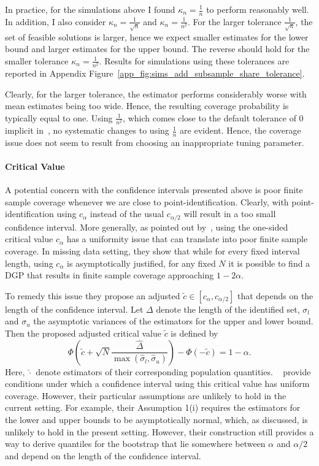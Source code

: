 \documentclass[12pt,a4paper,english]{article} %
\numberwithin{equation}{section}
\theoremstyle{definition}
\theoremstyle{remark}
\theoremstyle{plain}
\begin{document}
In practice, for the simulations above I found $\kappa_n = \frac{1}{n}$ to perform reasonably well.
In addition, I also consider $\kappa_n = \frac{1}{\sqrt{n}}$ and $\kappa_n = \frac{1}{n^2}$.
For the larger tolerance $\frac{1}{\sqrt{n}}$, the set of feasible solutions is larger, hence we expect smaller estimates for the lower bound and larger estimates for the upper bound.
The reverse should hold for the smaller tolerance $\kappa_n = \frac{1}{n^2}$.
Results for simulations using these tolerances are reported in Appendix Figure~\ref{app_fig:sims_add_subsample_share_tolerance}.

Clearly, for the larger tolerance, the estimator performs considerably worse with mean estimates being too wide.
Hence, the resulting coverage probability is typically equal to one.
Using $\frac{1}{n^2}$, which comes close to the default tolerance of $0$ implicit in~\cite{shea2023ivmte}, no systematic changes to using $\frac{1}{n}$ are evident.
Hence, the coverage issue does not seem to result from choosing an inappropriate tuning parameter.

\paragraph{Critical Value}
A potential concern with the confidence intervals presented above is poor finite sample coverage whenever we are close to point-identification.
Clearly, with point-identification using $c_\alpha$ instead of the usual $c_{\alpha/2}$ will result in a too small confidence interval.
More generally, as pointed out by~\cite{imbens2004confidence}, using the one-sided critical value $c_\alpha$ has a uniformity issue that can translate into poor finite sample coverage.
In missing data setting, they show that while for every fixed interval length, using $c_\alpha$ is asymptotically justified, for any fixed $N$ it is possible to find a DGP that results in finite sample coverage approaching $1-2\alpha$.

To remedy this issue they propose an adjusted $\tilde{c}\in[c_{\alpha}, c_{\alpha/2}]$ that depends on the length of the confidence interval.
Let $\Delta$ denote the length of the identified set, $\sigma_l$ and $\sigma_u$ the asymptotic variances of the estimators for the upper and lower bound.
Then the proposed adjusted critical value $\tilde{c}$ is defined by
\begin{equation}\label{eq:imbens_manski_crit}
  \Phi\left(\tilde{c} + \sqrt{N}\frac{\hat{\Delta}}{\max(\hat{\sigma}_l, \hat{\sigma}_u)}\right) - \Phi\left(-\tilde{c}\right) = 1 - \alpha.
\end{equation}
Here, $\hat{\cdot}$ denote estimators of their corresponding population quantities.
~\cite{imbens2004confidence} provide conditions under which a confidence interval using this critical value has uniform coverage.
However, their particular assumptions are unlikely to hold in the current setting.
For example, their Assumption 1(i) requires the estimators for the lower and upper bounds to be asymptotically normal, which, as discussed, is unlikely to hold in the present setting.
However, their construction still provides a way to derive quantiles for the bootstrap that lie somewhere between $\alpha$ and $\alpha/2$ and depend on the length of the confidence interval.
\end{document}
